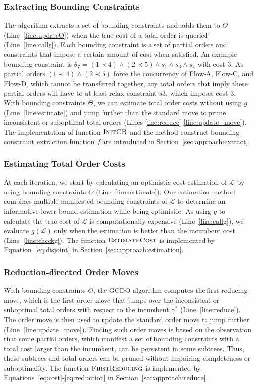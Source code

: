 \documentclass[letterpaper]{article} %
\theoremstyle{definition}
\newcommand{\LE}{\mathcal{L}}
\begin{document}
\subsubsection{Extracting Bounding Constraints} The algorithm extracts a set of bounding constraints and adds them to $\Theta$ (Line~\ref{line:updateO}) when the true cost of a total order is queried (Line~\ref{line:callg}). Each bounding constraint is a set of partial orders and constraints that impose a certain amount of cost when satisfied.
An example bounding constraint is $\theta_7 = (1 \prec 4) \land (2 \prec 5) \land s_1 \land s_3 \land s_4$ with cost $3$. As partial orders $(1 \prec 4) \land (2 \prec 5)$ force the concurrency of Flow-A, Flow-C, and Flow-D, which cannot be transferred together, any total orders that imply these partial orders will have to at least relax constraint $s3$, which imposes cost $3$. With bounding constraints $\Theta$, we can estimate total order costs without using $g$ (Line~\ref{line:estimate}) and jump further than the standard move to prune inconsistent or suboptimal total orders (Lines \ref{line:reduce}-\ref{line:update_move}). The implementation of function $\textsc{InitCB}$ and the method construct bounding constraint extraction function $f$ are introduced in Section~\ref{sec:approach:extract}.

\subsubsection{Estimating Total Order Costs} At each iteration, we start by calculating an optimistic cost estimation of $\LE$ by using bounding constraints $\Theta$ (Line~\ref{line:estimate}). Our estimation method combines multiple manifested bounding constraints of $\LE$ to determine an informative lower bound estimation while being optimistic. As using $g$ to calculate the true cost of $\LE$ is computationally expensive (Line~\ref{line:callg}), we evaluate $g(\LE)$ only when the estimation is better than the incumbent cost (Line~\ref{line:checkg}). The function $\textsc{EstimateCost}$ is implemented by Equation~\ref{eq:disjoint} in Section~\ref{sec:approach:estimation}.

\subsubsection{Reduction-directed Order Moves} With bounding constraints $\Theta$, the GCDO algorithm computes the first reducing move, which is the first order move that jumps over the inconsistent or suboptimal total orders with respect to the incumbent $\gamma^*$ (Line~\ref{line:reduce}). The order move is then used to update the standard order move to jump further (Line~\ref{line:update_move}). Finding such order moves is based on the observation that some partial orders, which manifest a set of bounding constraints with a total cost larger than the incumbent, can be persistent in some subtrees. Thus, these subtrees and total orders can be pruned without impairing completeness or suboptimality.   The function $\textsc{FirstReducing}$ is implemented by Equations~\ref{eq:cost}-\ref{eq:reduction} in Section~\ref{sec:approach:reduce}.
\end{document}
